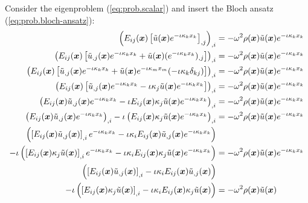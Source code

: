Consider the eigenproblem (\ref{eq:prob.scalar}) and insert the Bloch ansatz (\ref{eq:prob.bloch-ansatz}):
%
\begin{align}
    \left(
        E_{ij}(\boldsymbol{x}) \left[\tilde{u}(\boldsymbol{x}) e^{-\iota \kappa_{k} x_{k}}\right]_{,j}
    \right)_{,i} &=
    -\omega^2 \rho(\boldsymbol{x}) \tilde{u}(\boldsymbol{x}) e^{-\iota \kappa_{k} x_{k}}
    \nonumber \\
    \left(
        E_{ij}(\boldsymbol{x}) \left[
            \tilde{u}_{,j}(\boldsymbol{x}) e^{-\iota \kappa_{k} x_{k}}
            + \tilde{u}(\boldsymbol{x}) (e^{-\iota \kappa_{k} x_{k}})_{,j}
        \right]
    \right)_{,i} &=
    -\omega^2 \rho(\boldsymbol{x}) \tilde{u}(\boldsymbol{x}) e^{-\iota \kappa_{k} x_{k}}
    \nonumber \\
    \left(
        E_{ij}(\boldsymbol{x}) \left[
            \tilde{u}_{,j}(\boldsymbol{x}) e^{-\iota \kappa_{k} x_{k}}
            + \tilde{u}(\boldsymbol{x}) e^{-\iota \kappa_{m} x_{m}} (-\iota \kappa_{k} \delta_{kj})
        \right]
    \right)_{,i} &=
    -\omega^2 \rho(\boldsymbol{x}) \tilde{u}(\boldsymbol{x}) e^{-\iota \kappa_{k} x_{k}}
    \nonumber \\
    \left(
        E_{ij}(\boldsymbol{x}) \left[
            \tilde{u}_{,j}(\boldsymbol{x}) e^{-\iota \kappa_{k} x_{k}}
            - \iota \kappa_{j} \tilde{u}(\boldsymbol{x}) e^{-\iota \kappa_{k} x_{k}}
        \right]
    \right)_{,i} &=
    -\omega^2 \rho(\boldsymbol{x}) \tilde{u}(\boldsymbol{x}) e^{-\iota \kappa_{k} x_{k}}
    \nonumber \\
    \left(
        E_{ij}(\boldsymbol{x}) \tilde{u}_{,j}(\boldsymbol{x}) e^{-\iota \kappa_{k} x_{k}}
        - \iota E_{ij}(\boldsymbol{x}) \kappa_{j} \tilde{u}(\boldsymbol{x}) e^{-\iota \kappa_{k} x_{k}}
    \right)_{,i} &=
    -\omega^2 \rho(\boldsymbol{x}) \tilde{u}(\boldsymbol{x}) e^{-\iota \kappa_{k} x_{k}}
    \nonumber \\
    \left(
        E_{ij}(\boldsymbol{x}) \tilde{u}_{,j}(\boldsymbol{x}) e^{-\iota \kappa_{k} x_{k}}
    \right)_{,i}
    - \iota \left(
        E_{ij}(\boldsymbol{x}) \kappa_{j} \tilde{u}(\boldsymbol{x}) e^{-\iota \kappa_{k} x_{k}}
    \right)_{,i} &=
    -\omega^2 \rho(\boldsymbol{x}) \tilde{u}(\boldsymbol{x}) e^{-\iota \kappa_{k} x_{k}}
    \nonumber \\
    \left(
        \left[
            E_{ij}(\boldsymbol{x}) \tilde{u}_{,j}(\boldsymbol{x})
        \right]_{,i} e^{-\iota \kappa_{k} x_{k}}
        -\iota \kappa_{i} E_{ij}(\boldsymbol{x}) \tilde{u}_{,j}(\boldsymbol{x}) e^{-\iota \kappa_{k} x_{k}}
    \right)& \nonumber \\
    - \iota \left(
        \left[
            E_{ij}(\boldsymbol{x}) \kappa_{j} \tilde{u}(\boldsymbol{x})
        \right]_{,i} e^{-\iota \kappa_{k} x_{k}}
        - \iota \kappa_{i} E_{ij}(\boldsymbol{x}) \kappa_{j} \tilde{u}(\boldsymbol{x})
        e^{-\iota \kappa_{k} x_{k}}
    \right) &=
    -\omega^2 \rho(\boldsymbol{x}) \tilde{u}(\boldsymbol{x}) e^{-\iota \kappa_{k} x_{k}}
    \nonumber \\
    \left(
        \left[
            E_{ij}(\boldsymbol{x}) \tilde{u}_{,j}(\boldsymbol{x})
        \right]_{,i}
        -\iota \kappa_{i} E_{ij}(\boldsymbol{x}) \tilde{u}_{,j}(\boldsymbol{x})
    \right)& \nonumber \\
    - \iota \left(
        \left[
            E_{ij}(\boldsymbol{x}) \kappa_{j} \tilde{u}(\boldsymbol{x})
        \right]_{,i}
        - \iota \kappa_{i} E_{ij}(\boldsymbol{x}) \kappa_{j} \tilde{u}(\boldsymbol{x})
    \right) &=
    -\omega^2 \rho(\boldsymbol{x}) \tilde{u}(\boldsymbol{x})
\end{align}

